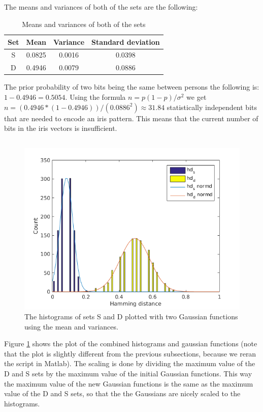 \documentclass{article}
\begin{document}
\subsection{}
The means and variances of both of the sets are the following:
\begin{table}[H]
 \begin{tabular}{|c|c|c|c|}
  \hline
  Set & Mean & Variance & Standard deviation \\
  \hline
  S & 0.0825 & 0.0016 & 0.0398 \\
  \hline
  D & 0.4946 & 0.0079 & 0.0886 \\
  \hline
 \end{tabular}
 \caption{Means and variances of both of the sets}
 \label{tab2.5}
\end{table}
\noindent The prior probability of two bits being the same between persons the following is: $1-0.4946=0.5054$.
Using the formula $n=p(1-p)/\sigma^2$ we get $n=(0.4946*(1-0.4946))/(0.0886^2)\approx 31.84$ statistically independent bits that are needed to encode an iris pattern. This means that the current number of bits in the iris vectors is insufficient.

\subsection{}
\begin{figure}[H]
	\centering
	\includegraphics[width=\linewidth]{2_6.png}
	\caption{The histograms of sets S and D plotted with two Gaussian functions using the mean and variances.}
	\label{fig2.6}
\end{figure}
Figure \ref{fig2.6} shows the plot of the combined histograms and gaussian functions (note that the plot is slightly different from the previous subsections, because we reran the script in Matlab). The scaling is done by dividing the maximum value of the D and S sets by the maximum value of the initial Gaussian functions. This way the maximum value of the new Gaussian functions is the same as the maximum value of the D and S sets, so that the the Gaussians are nicely scaled to the histograms.
\end{document}
